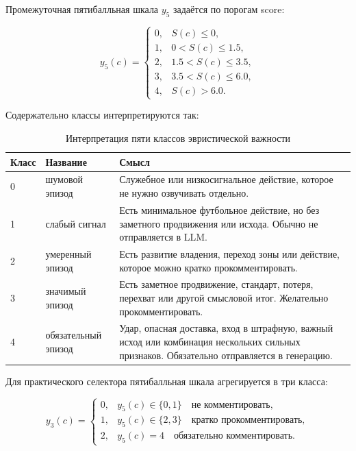 \documentclass[a4paper,14pt]{extarticle}
\numberwithin{table}{section}
\numberwithin{figure}{section}
\numberwithin{equation}{section}
\begin{document}
Промежуточная пятибалльная шкала $y_5$ задаётся по порогам score:

\begin{equation}
 y_5(c) =
 \begin{cases}
 0, & S(c) \le 0,\\
 1, & 0 < S(c) \le 1.5,\\
 2, & 1.5 < S(c) \le 3.5,\\
 3, & 3.5 < S(c) \le 6.0,\\
 4, & S(c) > 6.0.
 \end{cases}
\end{equation}

Содержательно классы интерпретируются так:

\begin{table}[H]
\caption{Интерпретация пяти классов эвристической важности}
\label{tab:soft-label-5}
\centering
\small
\begin{tabular}{p{}p{}p{}}
\toprule
\textbf{Класс} & \textbf{Название} & \textbf{Смысл} \\
\midrule
0 & шумовой эпизод & Служебное или низкосигнальное действие, которое не нужно озвучивать отдельно. \\
1 & слабый сигнал & Есть минимальное футбольное действие, но без заметного продвижения или исхода. Обычно не отправляется в LLM. \\
2 & умеренный эпизод & Есть развитие владения, переход зоны или действие, которое можно кратко прокомментировать. \\
3 & значимый эпизод & Есть заметное продвижение, стандарт, потеря, перехват или другой смысловой итог. Желательно прокомментировать. \\
4 & обязательный эпизод & Удар, опасная доставка, вход в штрафную, важный исход или комбинация нескольких сильных признаков. Обязательно отправляется в генерацию. \\
\bottomrule
\end{tabular}
\end{table}

Для практического селектора пятибалльная шкала агрегируется в три класса:

\begin{equation}
 y_3(c) =
 \begin{cases}
 0, & y_5(c) \in \{0,1\} \quad \text{не комментировать},\\
 1, & y_5(c) \in \{2,3\} \quad \text{кратко прокомментировать},\\
 2, & y_5(c)=4 \quad \text{обязательно комментировать}.
 \end{cases}
\end{equation}
\end{document}
